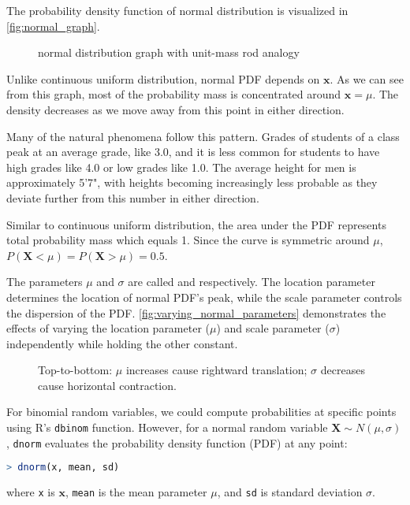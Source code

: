 The probability density function of normal distribution is visualized in \autoref{fig:normal_graph}.
\begin{figure}[t]
\begin{center}
\end{center}
\caption{normal distribution graph with unit-mass rod analogy}
\label{fig:normal_graph}
\end{figure}
Unlike continuous uniform distribution, normal PDF depends on \( \bm{x} \).
As we can see from this graph, most of the probability mass is concentrated around \( \bm{x} = \mu \).
The density decreases as we move away from this point in either direction.

Many of the natural phenomena follow this pattern.
Grades of students of a class peak at an average grade, like 3.0, and it is less common for students to have high grades like 4.0 or low grades like 1.0.
The average height for men is approximately 5'7",
with heights becoming increasingly less probable as they deviate further from this number in either direction.

Similar to continuous uniform distribution, the area under the PDF represents total probability mass which equals 1.
Since the curve is symmetric around \( \mu \), \( P(\bm{X} < \mu) = P(\bm{X} > \mu) = 0.5 \).

The parameters \( \mu \) and \( \sigma \) are called  and  respectively.
The location parameter determines the location of normal PDF's peak, while the scale parameter controls the dispersion of the PDF.
\autoref{fig:varying_normal_parameters} demonstrates the effects of varying the location parameter (\( \mu \)) and scale parameter (\( \sigma \)) independently while holding the other constant.
\begin{figure}[t]
\begin{center}
\end{center}
\caption{Top-to-bottom: \( \mu \) increases cause rightward translation; \( \sigma \) decreases cause horizontal contraction.}
\label{fig:varying_normal_parameters}
\end{figure}
For binomial random variables, we could compute probabilities at specific points using R's \verb|dbinom| function.
However, for a normal random variable \( \bm{X} \sim N(\mu, \sigma) \),
\verb|dnorm| evaluates the probability density function (PDF) at any point:
\begin{lstlisting}[language=R]
> dnorm(x, mean, sd)
\end{lstlisting}
where \verb|x| is \( \bm{x} \), \verb|mean| is the mean parameter \( \mu \), and \verb|sd| is standard deviation \( \sigma \).


